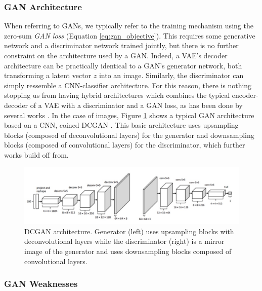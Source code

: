 \subsubsection{GAN Architecture}\label{sec:gan_architecture}
When referring to \ac{GAN}s, we typically refer 
to the training mechanism using the zero-sum \emph{GAN loss} (Equation \ref{eq:gan_objective}). This requires 
some generative network and a discriminator network trained jointly, but there is no further constraint on the 
architecture used by a \ac{GAN}.  Indeed, a \ac{VAE}'s decoder architecture can be practically identical
to a \ac{GAN}'s generator network, both transforming a latent vector $z$ into an image. Similarly, the 
discriminator can simply ressemble a CNN-classifier architecture. 
For this reason, there is nothing stopping us from having hybrid architectures which combines the 
typical encoder-decoder of a 
\ac{VAE} with a discriminator and a \ac{GAN} loss, as has been done by several works \citep{larsen2016autoencoding, 
xian2019f, esser2021taming}. In the case of images, Figure \ref{fig:dcgan} shows a typical \ac{GAN} architecture based 
on a \ac{CNN}, coined \ac{DCGAN} \citep{dcgan}. This basic architecture uses upsampling blocks 
(composed of deconvolutional layers) for the generator and downsampling blocks (composed of convolutional layers)
for the discriminator, which further works build off from. 

\begin{figure}[tb]
      \begin{center}
          \includegraphics[width=1.0\linewidth]{images/related/dcgan.jpg}
      \end{center}
      \caption{DCGAN architecture. Generator (left) uses upsampling blocks with deconvolutional layers while the discriminator 
      (right) is a mirror image of the generator and uses downsampling blocks composed of convolutional layers.}
      \label{fig:dcgan}
  \end{figure}


\subsubsection{GAN Weaknesses}\label{subsubsection:gan_weaknesses}

